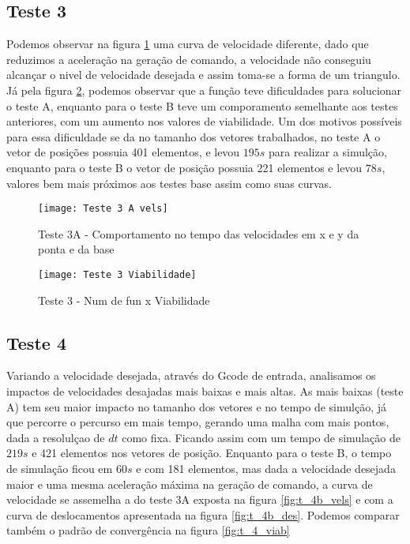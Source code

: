 \subsection{Teste 3}
Podemos observar na figura \ref{fig:t_3a_vels} uma curva de velocidade diferente, dado que reduzimos a aceleração
na geração de comando, a velocidade não conseguiu alcançar o nivel de velocidade desejada e assim toma-se a forma de um triangulo.
Já pela figura \ref{fig:t_3_viab}, podemos observar que a função teve dificuldades para solucionar o teste A, enquanto para o teste B
teve um comporamento semelhante aos testes anteriores, com um aumento nos valores de viabilidade.
Um dos motivos possíveis para essa dificuldade se da no tamanho dos vetores trabalhados, no teste A o vetor de posições
possuia 401 elementos, e levou $195 s$ para realizar a simulção, enquanto para o teste B o vetor de posição possuia 221 elementos
e levou $78 s$, valores bem mais próximos aos testes base assim como suas curvas.

\begin{figure}[!htb]
    \begin{center}
    \caption{Teste 3A - Comportamento no tempo das velocidades em x e y da ponta e da base}
    \texttt{[image: Teste 3 A vels]}
    \label{fig:t_3a_vels}
    \end{center}
\end{figure}

\begin{figure}[!htb]
    \begin{center}
    \caption{Teste 3 - Num de fun x Viabilidade}
    \texttt{[image: Teste 3 Viabilidade]}
    \label{fig:t_3_viab}
    \end{center}
\end{figure}

\subsection{Teste 4}
Variando a velocidade desejada, através do Gcode de entrada, analisamos os impactos de velocidades desajadas mais baixas e mais altas.
As mais baixas (teste A) tem seu maior impacto no tamanho dos vetores e no tempo de simulção, já que percorre o percurso em mais tempo,
gerando uma malha com mais pontos, dada a resolulçao de $dt$ como fixa. Ficando assim com um tempo de simulação de $219 s$ e 421 elementos nos vetores de posição.
Enquanto para o teste B, o tempo de simulação ficou em $60 s$ e com 181 elementos, mas dada a velocidade desejada maior e uma mesma aceleração máxima
na geração de comando, a curva de velocidade se assemelha a do teste 3A exposta na figura \ref{fig:t_4b_vels} e com a curva de deslocamentos apresentada na figura \ref{fig:t_4b_des}.
Podemos comparar também o padrão de convergência na figura \ref{fig:t_4_viab}

